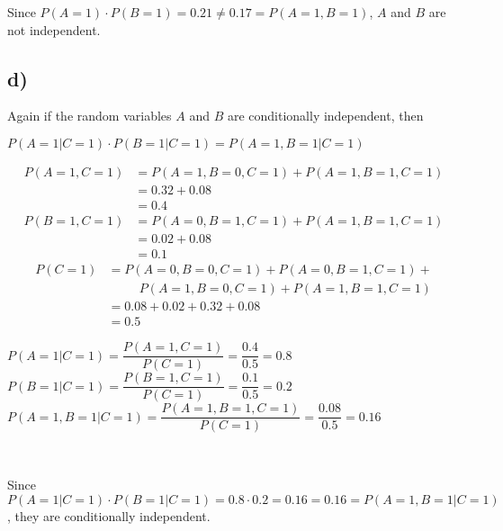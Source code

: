\documentclass[12pt]{article}
\begin{document}
    Since $P(A=1) \cdot P(B=1) = 0.21 \neq 0.17 = P(A=1, B=1)$, $A$ and $B$ are not independent.

\subsection*{d)}
    Again if the random variables $A$ and $B$ are conditionally independent, then
    
    \begin{center}
        $P(A=1|C=1) \cdot P(B=1|C=1) = P(A=1, B=1|C=1)$
    \end{center}{}
    
    \begin{align*}
        P(A=1, C=1) &= P(A=1, B=0, C=1) + P(A=1, B=1, C=1) \\
        &= 0.32 + 0.08 \\
        &= 0.4
    \end{align*}{}
    \begin{align*}
        P(B=1, C=1) &= P(A=0, B=1, C=1) + P(A=1, B=1, C=1) \\
        &= 0.02 + 0.08 \\
        &= 0.1
    \end{align*}{}
    \begin{align*}
        P(C=1) &= P(A=0, B=0, C=1) + P(A=0, B=1, C=1) + \\
        &\;\;\;\;\;\;\;\;\;P(A=1, B=0, C=1) + P(A=1, B=1, C=1) \\
        &= 0.08 + 0.02 + 0.32 + 0.08 \\
        &= 0.5
    \end{align*}{}
    \begin{center}
        $P(A=1|C=1) = \dfrac{P(A=1, C=1)}{P(C=1)} = \dfrac{0.4}{0.5} = 0.8$ \\
        $P(B=1|C=1) = \dfrac{P(B=1, C=1)}{P(C=1)} = \dfrac{0.1}{0.5} = 0.2$ \\
        $P(A=1, B=1|C=1) = \dfrac{P(A=1, B=1, C=1)}{P(C=1)} = \dfrac{0.08}{0.5} = 0.16$
    \end{center}{}
    
    ~
    
    Since $P(A=1|C=1) \cdot P(B=1|C=1) = 0.8 \cdot 0.2 = 0.16 = 0.16 = P(A=1, B=1|C=1)$, they are conditionally independent.
    
\end{document}
